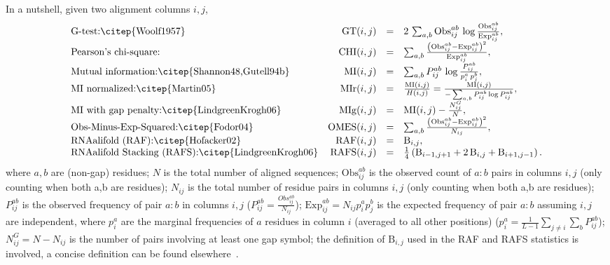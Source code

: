 \noindent
In a nutshell, given two
alignment columns $i,j$,
%
\[
\begin{array}{lrcl}
  \mbox{G-test:\citep{Woolf1957}}                                       & \mathrm{GT}(i,j)   & = & 2 \, \sum_{a,b} \mathrm{Obs}^{ab}_{ij} \, \log \frac{ \mathrm{Obs}^{ab}_{ij} } { \mathrm{Exp}^{ab}_{ij} }, \\
  \mbox{Pearson's chi-square:}                                          & \mathrm{CHI}(i,j)  & = &      \sum_{a,b} \frac{ \left(\mathrm{Obs}^{ab}_{ij} - \mathrm{Exp}^{ab}_{ij}\right)^2 }{\mathrm{Exp}^{ab}_{ij}},\\ 
  \mbox{Mutual information:\citep{Shannon48,Gutell94b}}                 & \mathrm{MI}(i,j)   & = &      \sum_{a,b} P^{ab}_{ij} \, \log \frac{ P^{ab}_{ij} }{ p^{a}_{i} \, p^{b}_{j}},                       \\
  \mbox{MI normalized:\citep{Martin05}}                                 & \mathrm{MIr}(i,j)  & = & \frac{\mathrm{MI}(i,j)} {H(i,j)} = \frac{\mathrm{MI}(i,j)} { -\sum_{a,b} P^{ab}_{ij} \log  P^{ab}_{ij}},        \\
  \mbox{MI with gap penalty:\citep{LindgreenKrogh06}}                   & \mathrm{MIg}(i,j)  & = & \mathrm{MI}(i,j) - \frac{N^G_{ij}} {N},                                                                   \\
  \mbox{Obs-Minus-Exp-Squared:\citep{Fodor04}}                          & \mathrm{OMES}(i,j) & = &      \sum_{a,b} \frac{ \left(\mathrm{Obs}^{ab}_{ij} - \mathrm{Exp}^{ab}_{ij}\right)^2 }{N_{ij}},                \\
  \mbox{RNAalifold (RAF):\citep{Hofacker02}}                            & \mathrm{RAF}(i,j)  & = & \mathrm{B}_{i,j},                                      \\
  \mbox{RNAalifold Stacking (RAFS):\citep{LindgreenKrogh06}}            & \mathrm{RAFS}(i,j) & = & \frac{1}{4}\left(\mathrm{B}_{i-1,j+1}+2\,\mathrm{B}_{i,j}+\mathrm{B}_{i+1,j-1}\right).                                      \\
\end{array}
\]
%
\noindent
where $a,b$ are (non-gap) residues; $N$ is the total number of aligned
sequences; $\mathrm{Obs}^{ab}_{ij}$ is the observed count of $a:b$
pairs in columns $i,j$ (only counting when both a,b are residues);
$N_{ij}$ is the total number of residue pairs in columns $i,j$ (only
counting when both a,b are residues); $P^{ab}_{ij}$ is the observed
frequency of pair $a:b$ in columns $i,j$
($P^{ab}_{ij}=\frac{Obs^{ab}_{ij}}{N_{ij}}$); $\mathrm{Exp}^{ab}_{ij}=
N_{ij} p^a_ip^b_j$ is the expected frequency of pair $a:b$ assuming
$i,j$ are independent, where $p^a_i$ are the marginal frequencies of
$a$ residues in column $i$ (averaged to all other positions) ($p^a_i
= \frac{1}{L-1}\sum_{j\neq i} \sum_b P^{ab}_{ij}$); $N^G_{ij} = N -
N_{ij}$ is the number of pairs involving at least one gap symbol; the
definition of $\mathrm{B}_{i,j}$ used in the RAF and RAFS statistics
is involved, a concise definition can be found
elsewhere~\citep{LindgreenKrogh06}.

